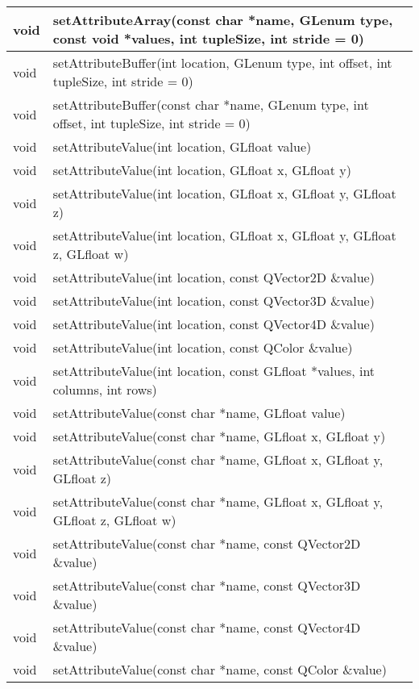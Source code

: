 \begin{longtable}[l]{|l|m{34em}|}
    void	&setAttributeArray(const char *name, GLenum type, const void *values, int tupleSize, int stride = 0) \\ 
    \hline
    void	&setAttributeBuffer(int location, GLenum type, int offset, int tupleSize, int stride = 0) \\ 
    \hline
    void	&setAttributeBuffer(const char *name, GLenum type, int offset, int tupleSize, int stride = 0) \\ 
    \hline
    void	&setAttributeValue(int location, GLfloat value) \\ 
    \hline
    void	&setAttributeValue(int location, GLfloat x, GLfloat y) \\ 
    \hline
    void	&setAttributeValue(int location, GLfloat x, GLfloat y, GLfloat z) \\ 
    \hline
    void	&setAttributeValue(int location, GLfloat x, GLfloat y, GLfloat z, GLfloat w) \\ 
    \hline
    void	&setAttributeValue(int location, const QVector2D \&value)  \\ 
    \hline
    void	&setAttributeValue(int location, const QVector3D \&value) \\ 
    \hline
    void	&setAttributeValue(int location, const QVector4D \&value) \\ 
    \hline
    void	&setAttributeValue(int location, const QColor \&value) \\ 
    \hline
    void	&setAttributeValue(int location, const GLfloat *values, int columns, int rows) \\ 
    \hline 
    void	&setAttributeValue(const char *name, GLfloat value) \\ 
    \hline 
    void	&setAttributeValue(const char *name, GLfloat x, GLfloat y) \\ 
    \hline
    void	&setAttributeValue(const char *name, GLfloat x, GLfloat y, GLfloat z) \\ 
    \hline
    void	&setAttributeValue(const char *name, GLfloat x, GLfloat y, GLfloat z, GLfloat w) \\ 
    \hline
    void	&setAttributeValue(const char *name, const QVector2D \&value) \\ 
    \hline
    void	&setAttributeValue(const char *name, const QVector3D \&value) \\ 
    \hline 
    void	&setAttributeValue(const char *name, const QVector4D \&value) \\
    \hline
    void	&setAttributeValue(const char *name, const QColor \&value) \\ 

\end{longtable}
